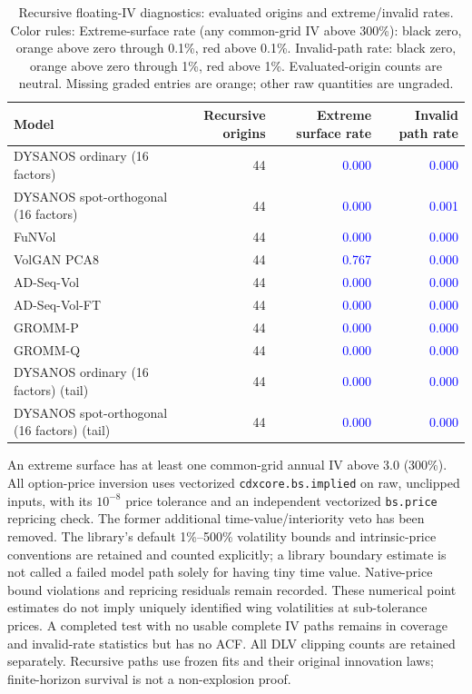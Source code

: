 \documentclass[11pt]{article}
\begin{document}
\begin{table}[H]\centering\small\setlength{\tabcolsep}{4pt}
\caption{Recursive floating-IV diagnostics: evaluated origins and extreme/invalid rates. Color rules: Extreme-surface rate (any common-grid IV above 300\%): black zero, orange above zero through 0.1\%, red above 0.1\%. Invalid-path rate: black zero, orange above zero through 1\%, red above 1\%. Evaluated-origin counts are neutral. Missing graded entries are orange; other raw quantities are ungraded.}\label{tab:recursive-stability}
\begin{tabular}{@{}lrrr@{}}
\toprule
Model & Recursive origins & Extreme surface rate & Invalid path rate \\
\midrule
DYSANOS ordinary (16 factors) & 44 & \textcolor{blue}{0.000} & \textcolor{blue}{0.000} \\
DYSANOS spot-orthogonal (16 factors) & 44 & \textcolor{blue}{0.000} & \textcolor{blue}{0.001} \\
FuNVol & 44 & \textcolor{blue}{0.000} & \textcolor{blue}{0.000} \\
VolGAN PCA8 & 44 & \textcolor{blue}{0.767} & \textcolor{blue}{0.000} \\
AD-Seq-Vol & 44 & \textcolor{blue}{0.000} & \textcolor{blue}{0.000} \\
AD-Seq-Vol-FT & 44 & \textcolor{blue}{0.000} & \textcolor{blue}{0.000} \\
GROMM-P & 44 & \textcolor{blue}{0.000} & \textcolor{blue}{0.000} \\
GROMM-Q & 44 & \textcolor{blue}{0.000} & \textcolor{blue}{0.000} \\
DYSANOS ordinary (16 factors) (tail) & 44 & \textcolor{blue}{0.000} & \textcolor{blue}{0.000} \\
DYSANOS spot-orthogonal (16 factors) (tail) & 44 & \textcolor{blue}{0.000} & \textcolor{blue}{0.000} \\
\bottomrule\end{tabular}\end{table}

An extreme surface has at least one common-grid annual IV above 3.0 (300\%). All option-price inversion uses vectorized \texttt{cdxcore.bs.implied} on raw, unclipped inputs, with its $10^{-8}$ price tolerance and an independent vectorized \texttt{bs.price} repricing check. The former additional time-value/interiority veto has been removed. The library's default 1\%--500\% volatility bounds and intrinsic-price conventions are retained and counted explicitly; a library boundary estimate is not called a failed model path solely for having tiny time value. Native-price bound violations and repricing residuals remain recorded. These numerical point estimates do not imply uniquely identified wing volatilities at sub-tolerance prices. A completed test with no usable complete IV paths remains in coverage and invalid-rate statistics but has no ACF. All DLV clipping counts are retained separately. Recursive paths use frozen fits and their original innovation laws; finite-horizon survival is not a non-explosion proof.
\end{document}
